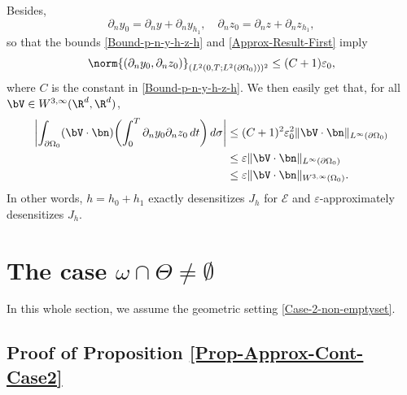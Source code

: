 Besides,
\[
\partial_n y_0 = \partial_n y + \partial_n y_{h_1}, \quad \partial_n z_0 = \partial_n z + \partial_n z_{h_1},
\]
so that the bounds \eqref{Bound-p-n-y-h-z-h} and \eqref{Approx-Result-First} imply
\[
\norm{(\partial_n y_0, \partial_n z_0)}_{(L^2(0,T; L^2(\partial \Omega_0)))^2}
\leq
(C+1) \varepsilon_0,
\]
where $C$ is the constant in \eqref{Bound-p-n-y-h-z-h}. We then easily get that, for all $\bV \in W^{3, \infty}(\R^d, \R^d)$,
\begin{align*}
\biggl| \int_{\partial\Omega_{0}}(\bV\cdot \bn)
\biggl(\int_{0}^{T}\partial_{n}y_{0}\partial_{n} z_{0}\, dt \biggr)\,
d\sigma
\biggr|
&\leq (C+1)^2 \varepsilon_0^2 \| \bV\cdot \bn\|_{L^\infty(\partial \Omega_0)}
\\
& \leq \varepsilon \| \bV\cdot \bn\|_{L^\infty(\partial \Omega_0)}\\
& \leq \varepsilon \| \bV\cdot \bn\|_{W^{3,\infty}(\Omega_0)}.
\end{align*}
In other words, $h = h_0 + h_1$ exactly desensitizes $J_h$ for $\mathcal{E}$ and $\varepsilon$-approximately desensitizes $J_h$.

\section{The case \texorpdfstring{$\omega \cap \Theta \neq \emptyset$}{omT}}
\label{Sec-Omega-Theta-Not-Empty}

In this whole section, we assume the geometric setting \eqref{Case-2-non-emptyset}.

\subsection{Proof of Proposition \ref{Prop-Approx-Cont-Case2}}\label{Subsec-Proof-ApproxCont-Case2}

